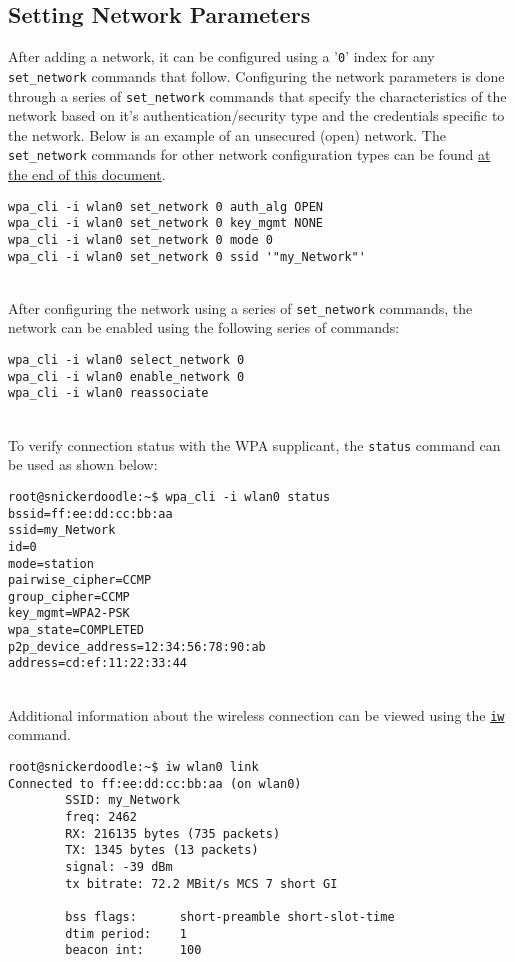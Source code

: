 \subsection{Setting Network Parameters}
After adding a network, it can be configured using a '\texttt{0}' index for any \texttt{set\_network} commands that follow. Configuring the network parameters is done through a series of \texttt{set\_network} commands that specify the characteristics of the network based on it's authentication/security type and the credentials specific to the network. Below is an example of an unsecured (open) network. The \texttt{set\_network} commands for other network configuration types can be found \hyperref[sec:wpacliconfigs]{at the end of this document}. \\

\begin{lstlisting}[style=text]
wpa_cli -i wlan0 set_network 0 auth_alg OPEN
wpa_cli -i wlan0 set_network 0 key_mgmt NONE
wpa_cli -i wlan0 set_network 0 mode 0
wpa_cli -i wlan0 set_network 0 ssid '"my_Network"'
\end{lstlisting}


~\\
After configuring the network using a series of \texttt{set\_network} commands, the network can be enabled using the following series of commands: \\

\begin{lstlisting}
wpa_cli -i wlan0 select_network 0
wpa_cli -i wlan0 enable_network 0
wpa_cli -i wlan0 reassociate
\end{lstlisting}

~\\
\noindent
To verify connection status with the WPA supplicant, the \texttt{status} command can be used as shown below: \\

\begin{lstlisting}
root@snickerdoodle:~$ wpa_cli -i wlan0 status
bssid=ff:ee:dd:cc:bb:aa
ssid=my_Network
id=0
mode=station
pairwise_cipher=CCMP
group_cipher=CCMP
key_mgmt=WPA2-PSK
wpa_state=COMPLETED
p2p_device_address=12:34:56:78:90:ab
address=cd:ef:11:22:33:44
\end{lstlisting}


~\\
\noindent
Additional information about the wireless connection can be viewed using the \href{http://linux.die.net/man/8/iw}{\texttt{iw}} command. \\
\begin{lstlisting}[style=text]
root@snickerdoodle:~$ iw wlan0 link
Connected to ff:ee:dd:cc:bb:aa (on wlan0)
        SSID: my_Network
        freq: 2462
        RX: 216135 bytes (735 packets)
        TX: 1345 bytes (13 packets)
        signal: -39 dBm
        tx bitrate: 72.2 MBit/s MCS 7 short GI

        bss flags:      short-preamble short-slot-time
        dtim period:    1
        beacon int:     100
\end{lstlisting}

